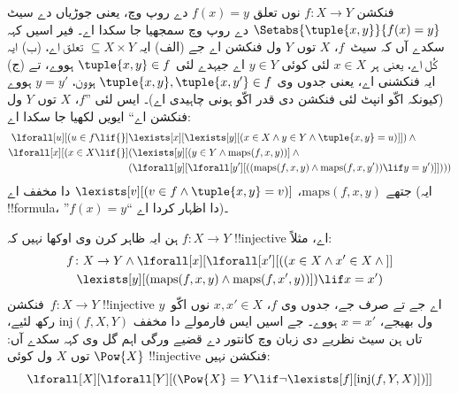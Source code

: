 \documentclass[../../../include/open-logic-section]{subfiles}
\begin{document}
فنکشن $f \colon X \to Y$ نوں تعلق $f(x)
= y$ دے روپ وچ، یعنی جوڑیاں دے سیٹ
$\Setabs{\tuple{x,y}}{f(x) = y}$ دے روپ وچ سمجھیا جا سکدا اے۔
فیر اسیں کہہ سکدے آں کہ سیٹ~$f$، $X$ توں $Y$ ول فنکشن
اے جے (الف) ایہ $\subseteq X \times Y$ تعلق اے، (ب) ایہ
کُل اے، یعنی ہر $x \in X$ لئی کوئی $y \in Y$ اے
جیہدے لئی $\tuple{x, y} \in f$ ہووے، تے (ج) ایہ
فنکشنی اے، یعنی جدوں وی $\tuple{x, y}, \tuple{x, y'} \in f$
ہوون، $y = y'$ ہووے (کیونکہ اکّو انپٹ لئی فنکشن دی
قدر اکّو ہونی چاہیدی اے)۔ ایس لئی ”$f$، $X$ توں $Y$ ول
فنکشن اے“ ایویں لکھیا جا سکدا اے:
\begin{align*}
 \lforall[u][(u \in f \lif {}] & \lexists[x][\lexists[y][(x \in X \land y \in
      Y \land \tuple{x, y} = u)]]) \land {}\\
 \lforall[x][(x \in X \lif {}] &
      (\lexists[y][(y \in Y \land \mathrm{maps}(f, x, y))] \land {}\\
& (\lforall[y][\lforall[y'][((\mathrm{maps}(f, x, y) \land
    \mathrm{maps}(f, x, y')) \lif y = y')]])))
\end{align*}
جتھے $\mathrm{maps}(f, x, y)$، $\lexists[v][(v \in f \land
  \tuple{x, y} = v)]$ دا مخفف اے (ایہ !!{formula}،
”$f(x) = y$“ دا اظہار کردا اے)۔

ہن ایہ ظاہر کرن وی اوکھا نہیں کہ $f\colon X \to Y$
!!{injective} اے، مثلاً:
\begin{multline*}
 f \colon X \to Y \land \lforall[x][\lforall[x'][((x \in X \land x' \in
     X \land {}]] \\
 \lexists[y][(\mathrm{maps}(f, x, y) \land \mathrm{maps}(f,
        x', y))]) \lif x = x')
\end{multline*}
فنکشن~$f\colon X \to Y$ !!{injective} اے جے تے صرف
جے، جدوں وی $f$، $x, x' \in X$ نوں اکّو~$y$
ول بھیجے، $x = x'$ ہووے۔ جے اسیں ایس فارمولے
دا مخفف $\mathrm{inj}(f, X, Y)$ رکھ لئیے، تاں ہن
سیٹ نظریے دی زبان وچ کانتور دے قضیے ورگی اہم گل
وی کہہ سکدے آں: $\Pow{X}$ توں $X$ ول کوئی
!!{injective} فنکشن نہیں:
\[
\lforall[X][\lforall[Y][(\Pow{X} = Y \lif
    \lnot\lexists[f][\mathrm{inj}(f, Y, X)])]]
\]
\end{document}
